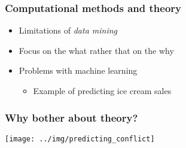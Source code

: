 \documentclass[aspectratio=43]{beamer}
\begin{document}









\begin{frame}
\frametitle{Computational methods and theory}
\centering

\begin{itemize}
  \item Limitations of \textit{data mining}
  \item Focus on the what rather that on the why
  \item Problems with machine learning
  \begin{itemize}
    \item Example of predicting ice cream sales
  \end{itemize}
\end{itemize}

\end{frame}

\begin{frame}
\frametitle{Why bother about theory?}
\centering

\texttt{[image: ../img/predicting\_conflict]}

\end{frame}
\end{document}

